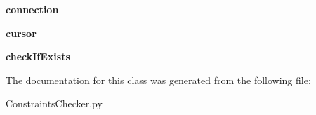 \begin{DoxyCompactItemize}
\item 
\hypertarget{classConstraintsChecker_1_1ConstraintsChecker_a30ca8cb6ae6f70e72c95f2c95c28994f}{{\bfseries connection}}\label{classConstraintsChecker_1_1ConstraintsChecker_a30ca8cb6ae6f70e72c95f2c95c28994f}

\item 
\hypertarget{classConstraintsChecker_1_1ConstraintsChecker_aec5ffe9f3153682500910f53e965804b}{{\bfseries cursor}}\label{classConstraintsChecker_1_1ConstraintsChecker_aec5ffe9f3153682500910f53e965804b}

\item 
\hypertarget{classConstraintsChecker_1_1ConstraintsChecker_af4064612fbb609651b02208077be8801}{{\bfseries check\-If\-Exists}}\label{classConstraintsChecker_1_1ConstraintsChecker_af4064612fbb609651b02208077be8801}

\end{DoxyCompactItemize}


The documentation for this class was generated from the following file\-:\begin{DoxyCompactItemize}
\item 
Constraints\-Checker.\-py\end{DoxyCompactItemize}
